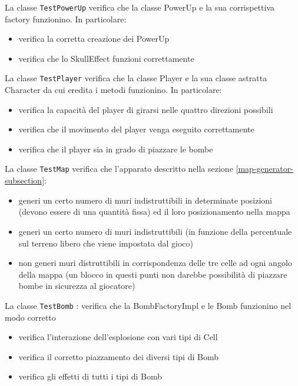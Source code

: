 \documentclass[a4paper,12pt]{report}
\begin{document}
\par
La classe \texttt{TestPowerUp} verifica che la classe PowerUp e la sua corrispettiva factory funzionino. In particolare:
\begin{itemize}
    \item verifica la corretta creazione dei PowerUp
    \item verifica che lo SkullEffect funzioni correttamente
\end{itemize}

\par
La classe \texttt{TestPlayer} verifica che la classe Player e la sua classe astratta Character da cui eredita i metodi funzionino. In particolare:
\begin{itemize}
    \item verifica la capacità del player di girarsi nelle quattro direzioni possibili
    \item verifica che il movimento del player venga eseguito correttamente
    \item verifica che il player sia in grado di piazzare le bombe
\end{itemize}

\par
La classe \texttt{TestMap} verifica che l'apparato descritto nella sezione \ref{map-generator-subsection}:
\begin{itemize}
    \item{generi un certo numero di muri indistruttibili in determinate posizioni (devono essere di una quantità fissa) ed il loro posizionamento nella mappa}
    \item{generi un certo numero di muri indistruttibili (in funzione della percentuale sul terreno libero che viene impostata dal gioco)}
    \item{non generi muri distruttibili in corrispondenza delle tre celle ad ogni angolo della mappa (un blocco in questi punti non darebbe possibilità di piazzare bombe in sicurezza al giocatore)}
\end{itemize}

\par
La classe \texttt{TestBomb} : verifica che la BombFactoryImpl e le Bomb funzionino nel modo corretto
\begin{itemize}
    \item verifica l'interazione dell'esplosione con vari tipi di Cell 
    \item verifica il corretto piazzamento dei diversi tipi di Bomb
    \item verifica gli effetti di tutti i tipi di Bomb
\end{itemize}
\end{document}
